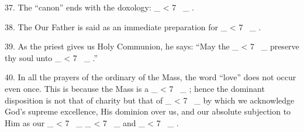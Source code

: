 \documentclass[a4paper,14pt]{memoir}
\newcounter{z}
\newcommand\spaces[1]{ \_\loop \ifnum\value{z} < #1
~\_%
\stepcounter{z}%
\repeat%
\setcounter{z}{0}}
\begin{document}
37. The “canon” ends  with
the doxology:  \spaces{7}.  

38.  The  Our  Father  is  said  as  an  immediate
preparation for \spaces{7}. 

39. As the priest  gives  us  Holy  Communion,  he
says: “May the \spaces{7} preserve thy soul unto \spaces{7}.”  

40.  In  all  the
prayers of the ordinary of the Mass, the word “love”  does  not  occur  even
once.  This  is  because  the  Mass  is  a  \spaces{7};  hence  the   dominant
disposition is not that  of  charity  but  that  of  \spaces{7}  by  which  we
acknowledge  God's  supreme  excellence,  His  dominion  over  us,  and  our
absolute subjection to Him as our \spaces{7} \spaces{7} and \spaces{7}.


\newpage
\end{document}
